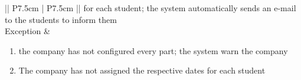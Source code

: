 \begin{table} [H]
\begin{tabular}{|| P{7.5cm} | P{7.5cm} ||}
						for each student; the system 
						automatically sends an e-mail to the 
						students to inform them   \\
						\hline
						Exception & \parbox{5cm}{\begin{enumerate}
								\item the company has not configured 
								every part; the system warn the 
								company
								\item The company has not assigned 
								the respective dates for each 
								student \\
						\end{enumerate}} \\
						\hline
					\end{tabular}
				\end{table}
				
				

